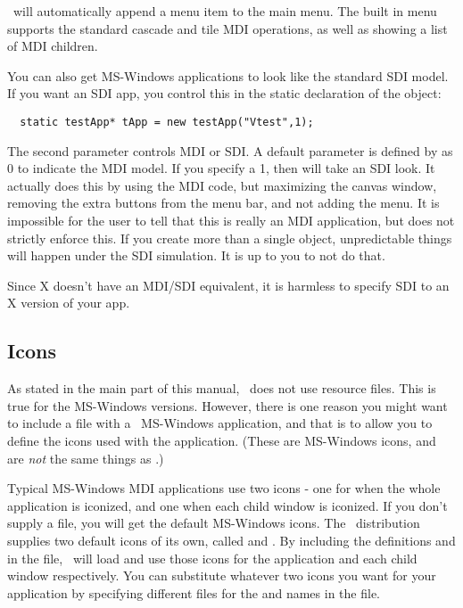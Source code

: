 \V\ will automatically append a  menu item to the main
menu. The built in  menu supports the standard cascade
and tile MDI operations, as well as showing a list of MDI children.

You can also get MS-Windows applications to look like the standard
SDI model. If you want an SDI app, you control this in the
static declaration of the  object:

\begin{verbatim}
  static testApp* tApp = new testApp("Vtest",1);
\end{verbatim}

The second parameter controls MDI or SDI. A default parameter
is defined by \V as 0 to indicate the MDI model. If you specify
a 1, then \V will take an SDI look. It actually does this
by using the MDI code, but maximizing the canvas window,
removing the extra buttons from the menu bar, and not
adding the  menu. It is impossible for the
user to tell that this is really an MDI application, but
\V does not strictly enforce this. If you create more than
a single  object, unpredictable things will
happen under the SDI simulation. It is up to you to not do that.

Since X doesn't have an MDI/SDI equivalent, it is harmless
to specify SDI to an X version of your app.

\subsection* {Icons}

As stated in the main part of this manual, \V\ does not use resource files.
This is true for the MS-Windows versions. However, there is one reason you
might want to include a  file with a \V\ MS-Windows application,
and that is to allow you to define the icons used with the application.
(These are MS-Windows icons, and are \emph{not} the same things as
.)

Typical MS-Windows MDI applications use two icons - one for when the whole application
is iconized, and one when each child window is iconized. If you don't supply a
 file, you will get the default MS-Windows icons. The \V\ distribution
supplies two default icons of its own, called  and .
By including the definitions    and
   in the  file,
\V\ will load and use those icons for the application and each child window
respectively. You can substitute whatever two icons you want for your application
by specifying different  files for
the  and  names in the  file.

